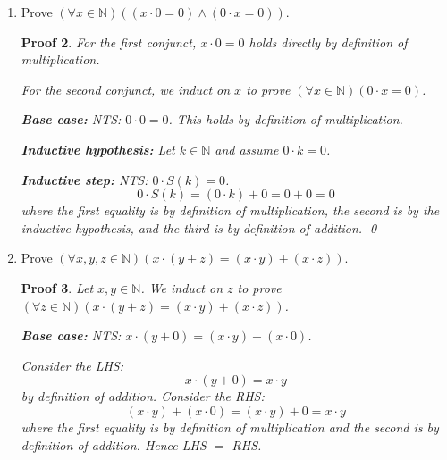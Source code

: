 \documentclass[12pt]{article}
\theoremstyle{proofstyle}
\newtheorem*{proof*}{Proof}
\begin{document}
\begin{enumerate}[left=0pt, itemsep=2em, parsep=1em]
\begin{proof*}
    \textbf{Inductive step:} NTS: $S(k) \cdot 1 = S(k)$ and $1 \cdot S(k) = S(k)$.

    Consider $S(k) \cdot 1$:
    \[
        S(k) \cdot 1 = S(k) \cdot S(0) = (S(k) \cdot 0) + S(k) = 0 + S(k) = S(k)
    \]
    where the first equality is by definition of $1 = S(0)$, the second is
    by definition of multiplication, the third is by definition of
    multiplication, and the fourth is by theorem.

    Consider $1 \cdot S(k)$:
    \[
        1 \cdot S(k) = (1 \cdot k) + 1 = k + 1 = S(k)
    \]
    where the first equality is by definition of multiplication, the second
    is by the inductive hypothesis, and the third is by definition of
    $S(k) = k + 1$. \qed
\end{proof*}

\item Prove $(\forall x \in \mathbb{N})((x \cdot 0 = 0) \wedge (0 \cdot x = 0))$.

\begin{proof*}
    For the first conjunct, $x \cdot 0 = 0$ holds directly by definition
    of multiplication.

    For the second conjunct, we induct on $x$ to prove
    $(\forall x \in \mathbb{N})(0 \cdot x = 0)$.

    \textbf{Base case:} NTS: $0 \cdot 0 = 0$.
    This holds by definition of multiplication.

    \textbf{Inductive hypothesis:} Let $k \in \mathbb{N}$ and assume
    $0 \cdot k = 0$.

    \textbf{Inductive step:} NTS: $0 \cdot S(k) = 0$.
    \[
        0 \cdot S(k) = (0 \cdot k) + 0 = 0 + 0 = 0
    \]
    where the first equality is by definition of multiplication, the second
    is by the inductive hypothesis, and the third is by definition of
    addition. \qed
\end{proof*}

\item Prove $(\forall x, y, z \in \mathbb{N})(x \cdot (y + z) = (x \cdot y) + (x \cdot z))$.

\begin{proof*}
    Let $x, y \in \mathbb{N}$. We induct on $z$ to prove
    $(\forall z \in \mathbb{N})(x \cdot (y + z) = (x \cdot y) + (x \cdot z))$.

    \textbf{Base case:} NTS: $x \cdot (y + 0) = (x \cdot y) + (x \cdot 0)$.

    Consider the LHS:
    \[
        x \cdot (y + 0) = x \cdot y
    \]
    by definition of addition. Consider the RHS:
    \[
        (x \cdot y) + (x \cdot 0) = (x \cdot y) + 0 = x \cdot y
    \]
    where the first equality is by definition of multiplication and the
    second is by definition of addition. Hence LHS $=$ RHS.


\end{proof*}
\end{enumerate}
\end{document}
